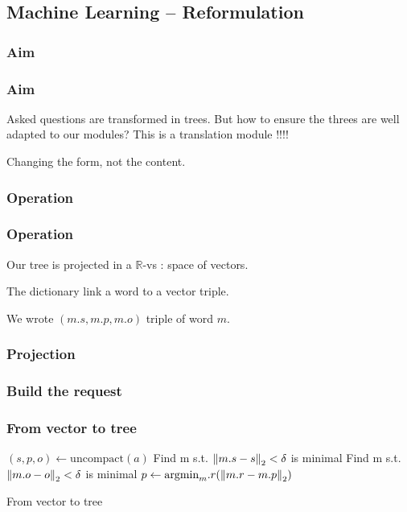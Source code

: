 \subsection{Machine Learning \--- Reformulation}

\subsubsection{Aim}

\begin{frame}
\frametitle{Aim}
Asked questions are transformed in trees. But how to ensure the threes are well adapted to our modules?
\pause
This is a translation module !!!!

Changing the form, not the content.
\end{frame}

\subsubsection{Operation}
\begin{frame}
\frametitle{Operation}
Our tree is projected in a $\mathbb{R}$-vs : space of vectors.

\begin{defi}
The dictionary link a word to a vector triple.

We wrote $(m.s,m.p,m.o)$ triple of word $m$.
\end{defi}

\end{frame}

\begin{frame}
\frametitle{Projection}
\end{frame}

\subsubsection{Build the request}

\begin{frame}
\frametitle{From vector to tree}
\begin{algorithm}[H]
\DontPrintSemicolon  %
$(s,p,o) \gets \text{uncompact}(a)$\;
Find m s.t. $\left\|m.s-s\right\|_2<\delta$ is minimal \;
Find m s.t. $\left\|m.o-o\right\|_2<\delta$ is minimal \;
$p \gets \text{argmin}_m.r (\left\|m.r-m.p\right\|_2)$\;
\;
\caption{ From vector to tree }
\end{algorithm}

\end{frame}

